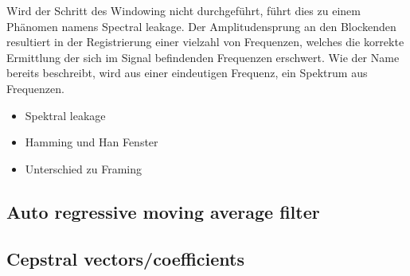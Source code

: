 Wird der Schritt des Windowing nicht durchgeführt, führt dies zu einem Phänomen namens Spectral leakage.
Der Amplitudensprung an den Blockenden resultiert in der Registrierung einer vielzahl von Frequenzen, welches die korrekte Ermittlung der sich im Signal befindenden Frequenzen erschwert.
Wie der Name bereits beschreibt, wird aus einer eindeutigen Frequenz, ein Spektrum aus Frequenzen.

\begin{itemize}
  \item Spektral leakage
  \item Hamming und Han Fenster
  \item Unterschied zu Framing
\end{itemize}
\subsection{Auto regressive moving average filter}

\subsection{Cepstral vectors/coefficients}
